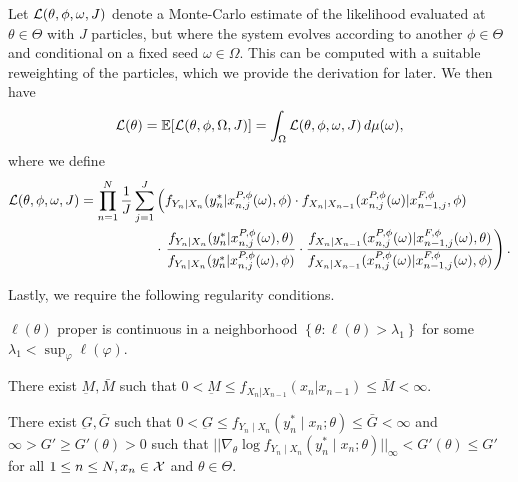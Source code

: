 \documentclass{article}
\begin{document}
\begin{defn}
\label{defn:doubly-off-policy}
Let $\mathcal{L}(\theta, \phi, \omega, J)$ denote a Monte-Carlo estimate of the likelihood evaluated at $\theta \in \Theta$ with $J$ particles, but where the system evolves according to another $\phi \in \Theta$ and conditional on a fixed seed $\omega \in \Omega$. This can be computed with a suitable reweighting of the particles, which we provide the derivation for later. We then have
\begin{equation} \label{eq:loglik2}
\mathcal{L}(\theta)=\mathbb{E}[\mathcal{L}(\theta,\phi,\Omega, J)]=\int_\Omega \mathcal{L}(\theta,\phi,\omega, J)\, d\mu(\omega),
\end{equation}
where we define
\begin{align}
    \mathcal{L}(\theta,\phi,\omega, J) = \prod_{n=1}^N \frac{1}{J} \sum_{j=1}^J &\left(f_{Y_n|X_n}(y_n^* | x_{n,j}^{P,\phi}(\omega), \phi) \cdot 
    f_{X_n|X_{n-1}}(x_{n,j}^{P, \phi}(\omega) | x_{n-1,j}^{F,\phi}, \phi) \right.\\
    &\cdot
    \left.
    \frac{f_{Y_n|X_n}(y^*_n|x_{n,j}^{P,\phi}(\omega),\theta)}{f_{Y_n|X_n}(y^*_n|x_{n,j}^{P,\phi}(\omega),\phi)}
    \cdot \frac{f_{X_n|X_{n-1}}(x_{n,j}^{P,\phi}(\omega)|x_{n-1,j}^{F,\phi}(\omega),\theta)}{f_{X_n|X_{n-1}}(x_{n,j}^{P,\phi}(\omega)|x_{n-1,j}^{F,\phi}(\omega),\phi)}\right).
\end{align}
\end{defn}

Lastly, we require the following regularity conditions.

\begin{aspt} $\ell(\theta)$ proper is continuous in a neighborhood $\left\{\theta: \ell(\theta)>\lambda_1\right\}$ for some $\lambda_1<\sup _{\varphi} \ell(\varphi)$.
\end{aspt}

\begin{aspt}
\label{assump:bounded-process}
    There exist $\underbar{M}, \bar{M}$ such that $0 < \underbar{M} \leq f_{X_n|X_{n-1}}(x_n | x_{n-1}) \leq \bar{M} < \infty$. 
\end{aspt}


\begin{aspt}
\label{assump:bounded-measurement}
There exist $\underbar{G}, \bar{G}$ such that $0<\underbar{G} \leq f_{Y_n \mid X_n}\left(y_n^* \mid x_n; \theta\right) \leq \bar{G} < \infty$ and $\infty > G' \geq G'(\theta)>0$ such that $||\nabla_\theta \log f_{Y_n \mid X_n}\left(y_n^* \mid x_n; \theta\right)||_\infty < G'(\theta) \leq G'$ for all $1 \leq n \leq N, x_n \in {\mathcal{X}}$ and $\theta \in \Theta.$
\end{aspt}
\end{document}

